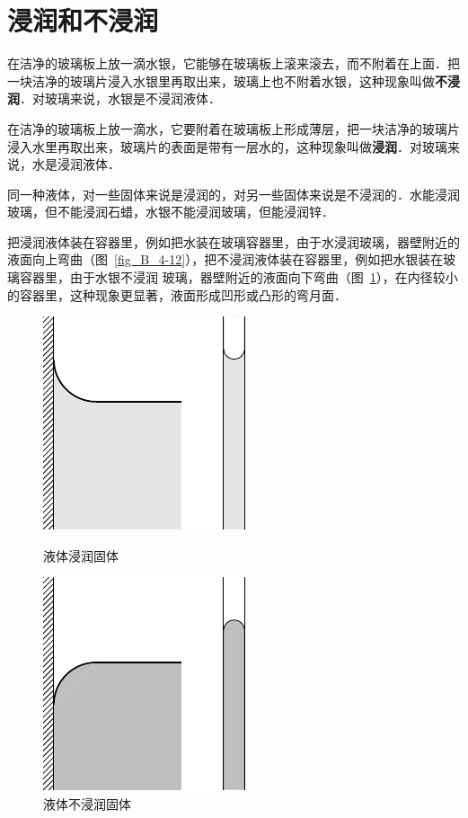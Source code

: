 \section{浸润和不浸润}
在洁净的玻璃板上放一滴水银，它能够在玻璃板上滚来滚去，而不附着在上面．把一块洁净的玻璃片浸入水银里再取出来，玻璃上也不附着水银，这种现象叫做\textbf{不浸润}．对玻璃来说，水银是不浸润液体．

在洁净的玻璃板上放一滴水，它要附着在玻璃板上形成薄层，把一块洁净的玻璃片浸入水里再取出来，玻璃片的表面是带有一层水的，这种现象叫做\textbf{浸润}．对玻璃来说，水是浸润液体．

同一种液体，对一些固体来说是浸润的，对另一些固体来说是不浸润的．水能浸润玻璃，但不能浸润石蜡，水银不能浸润玻璃，但能浸润锌．

把浸润液体装在容器里，例如把水装在玻璃容器里，由于水浸润玻璃，器壁附近的液面向上弯曲（图~\ref{fig_B_4-12}），把不浸润液体装在容器里，例如把水银装在玻璃容器里，由于水银不浸润
玻璃，器壁附近的液面向下弯曲（图~\ref{fig_B_4-13}），在内径较小的容器里，这种现象更显著，液面形成凹形或凸形的弯月面．

\begin{figure}[htbp]
    \centering
    \begin{minipage}[t]{0.48\textwidth}
        \centering
        \includegraphics{fig/B/4-12.pdf}
        \caption{液体浸润固体}\label{fig_B_4-12}
    \end{minipage}
    \hfil
    \begin{minipage}[t]{0.48\textwidth}
        \centering
        \includegraphics{fig/B/4-13.pdf}
        \caption{液体不浸润固体}\label{fig_B_4-13}
    \end{minipage}
\end{figure}

